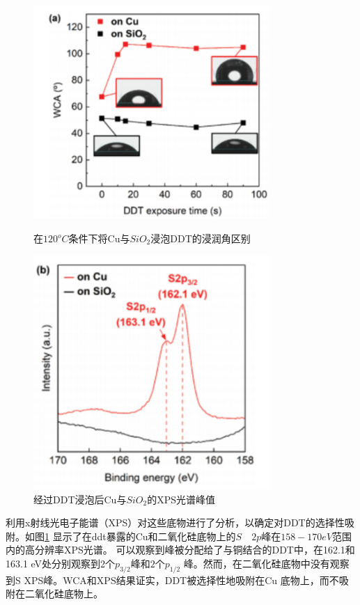 \documentclass[UTF8,a4paper,12pt]{ctexart}%
\begin{document}
\begin{figure}[htb]
	\centering
	\begin{minipage}[t]{0.5\textwidth}
	\centering
	\includegraphics[width=0.8\textwidth]{8.jpg}
	\caption{在$120^oC$条件下将Cu与$SiO_2$浸泡DDT的浸润角区别}
	\label{Fig:8}
	\end{minipage}
	\begin{minipage}[t]{0.45\textwidth}
	\centering
	\includegraphics[width=0.8\textwidth]{9.jpg}
	\caption{经过DDT浸泡后Cu与$SiO_2$的XPS光谱峰值}
	\label{Fig:9}
	\end{minipage}
\end{figure}


利用x射线光电子能谱（XPS）对这些底物进行了分析，以确定对DDT的选择性吸附。如图\ref{Fig:9}
显示了在ddt暴露的Cu和二氧化硅底物上的$S\quad {2p}$峰在$158-170eV$范围内的高分辨率XPS光谱。
可以观察到峰被分配给了与铜结合的DDT中，在162.1和163.1 eV处分别观察到2个$p_{3/2}$峰和$2个p_{1/2}$
峰。然而，在二氧化硅底物中没有观察到S XPS峰。WCA和XPS结果证实，DDT被选择性地吸附在Cu
底物上，而不吸附在二氧化硅底物上。
\end{document}
